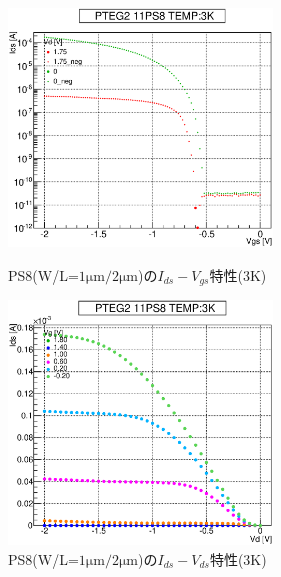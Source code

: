 				\begin{figure}[htbp]
					\begin{minipage}{0.5\hsize}
						\begin{center}
							\includegraphics[width=70mm]{./Chapter/Appendix/Picture/PST/PS8/PTEG2_11_PS8_IdVg_3K.eps}
						\end{center}
						\caption{PS8(W/L=$1\mathrm{\mu m}/2\mathrm{\mu m}$)の$I_{ds}-V_{gs}$特性(3K)}
						\label{fig:PS8_IdVg_3K}
					\end{minipage}
					\begin{minipage}{0.5\hsize}
						\begin{center}
							\includegraphics[width=70mm]{./Chapter/Appendix/Picture/PST/PS8/PTEG2_11_PS8_IdVd_3K.eps}
						\end{center}
						\caption{PS8(W/L=$1\mathrm{\mu m}/2\mathrm{\mu m}$)の$I_{ds}-V_{ds}$特性(3K)}
						\label{fig:PS8_IdVd_3K}
					\end{minipage}
				\end{figure}
			\clearpage
	
	
	
	
	
	